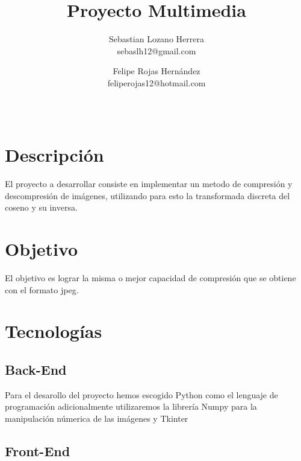 \documentclass{article}
\title{Proyecto Multimedia}
\author{Sebastian Lozano Herrera\\ sebaslh12@gmail.com \and Felipe Rojas Hernández\\ feliperojas12@hotmail.com}
\date{\ }
\begin{document}
\maketitle
\section{Descripción}
El proyecto a desarrollar consiste en implementar un metodo de compresión y
descompresión de imágenes, utilizando para esto la transformada discreta del coseno y su inversa.
\section{Objetivo}
El objetivo es lograr la misma o mejor capacidad de compresión que se obtiene con el formato jpeg.
\section{Tecnologías}
\subsection{Back-End}
Para el desarollo del proyecto hemos escogido Python como el lenguaje de programación adicionalmente
utilizaremos la librería Numpy para la manipulación númerica de las imágenes y Tkinter
\subsection{Front-End}
\end{document}

